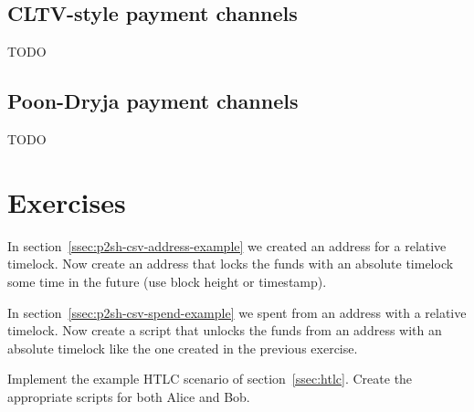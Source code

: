 \subsection*{CLTV-style payment channels}
TODO


\subsection*{Poon-Dryja payment channels}
TODO




\section{Exercises}

\begin{exercise}
In section~\ref{ssec:p2sh-csv-address-example} we created an address for a relative timelock. Now create an address that locks the funds with an absolute timelock some time in the future (use block height or timestamp).
\end{exercise}

\begin{exercise}
In section~\ref{ssec:p2sh-csv-spend-example} we spent from an address with a relative timelock. Now create a script that unlocks the funds from an address with an absolute timelock like the one created in the previous exercise.
\end{exercise}

\begin{exercise}
Implement the example HTLC scenario of section~\ref{ssec:htlc}. Create the appropriate scripts for both Alice and Bob.
\end{exercise}




